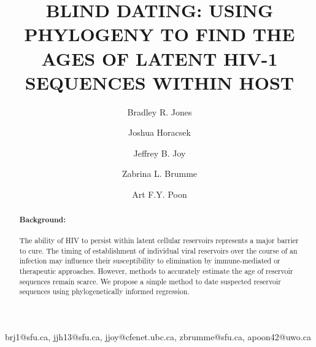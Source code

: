 \documentclass{bmcart}
\begin{document}

\begin{frontmatter}

\begin{fmbox}

\dochead{}

\title{\uppercase{Blind dating: using phylogeny to find the ages of latent HIV-1 sequences within host}}

\author[addressref={1,2},email={brj1@sfu.ca}]{Bradley R. Jones} %
\author[addressref={1,2},email={jjh13@sfu.ca}]{Joshua Horacsek} %
\author[addressref={2,3},email={jjoy@cfenet.ubc.ca}]{Jeffrey B. Joy} %
\author[addressref={1,2},email={zbrumme@sfu.ca}]{Zabrina L. Brumme} %
\author[addressref={2,3,4},email={apoon42@uwo.ca},corref={4}]{Art F.Y. Poon} %
\address[id=1]{    }
\address[id=2]{    }
\address[id=3]{    }
\address[id=4]{    }

brj1@sfu.ca, jjh13@sfu.ca, jjoy@cfenet.ubc.ca, zbrumme@sfu.ca, apoon42@uwo.ca
 
\printaddresses



\begin{artnotes}
\end{artnotes}

\end{fmbox}

\begin{abstractbox}
\begin{abstract}
\paragraph{Background:}
The ability of HIV to persist within latent cellular reservoirs represents a major barrier to
cure.
The timing of establishment of individual viral reservoirs over the course of an infection may influence their susceptibility to elimination by immune-mediated or therapeutic approaches.
However, methods to accurately estimate the age of reservoir sequences remain scarce.
We propose a simple method to date suspected reservoir sequences using phylogenetically informed regression.


\end{abstract}
\end{abstractbox}
\end{frontmatter}
\end{document}
